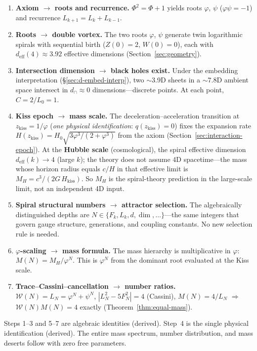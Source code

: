 \documentclass[12pt,a4paper]{article}
\begin{document}
\begin{enumerate}[nosep]
\item \textbf{Axiom $\to$ roots and recurrence.}\; $\Phi^2 = \Phi + 1$ yields roots $\varphi$, $\psi$ ($\varphi\psi = -1$) and recurrence $L_{k+1} = L_k + L_{k-1}$.
\item \textbf{Roots $\to$ double vortex.}\; The two roots $\varphi$, $\psi$ generate twin logarithmic spirals with sequential birth ($Z(0)=2$, $W(0)=0$), each with $d_{\mathrm{eff}}(4) \approx 3.92$ effective dimensions (Section~\ref{sec:geometry}).
\item \textbf{Intersection dimension $\to$ black holes exist.}\; Under the embedding interpretation (\S\ref{sec:d-embed-interp}), two $\sim$3.9D sheets in a $\sim$7.8D ambient space intersect in $d_\cap \approx 0$ dimensions---discrete points.  At each point, $C = 2/L_0 = 1$.
\item \textbf{Kiss epoch $\to$ mass scale.}\; The deceleration--acceleration transition at $z_{\mathrm{kiss}} = 1/\varphi$ (\emph{one physical identification}: $q(z_{\mathrm{kiss}}) = 0$) fixes the expansion rate $H(z_{\mathrm{kiss}}) = H_0\sqrt{3\varphi^3/(2+\varphi^3)}$ from the axiom (Section~\ref{sec:interaction-epoch}). At the \textbf{Hubble scale} (cosmological), the spiral effective dimension $d_{\mathrm{eff}}(k) \to 4$ (large $k$); the theory does not assume 4D spacetime---the mass whose horizon radius equals $c/H$ in that effective limit is $M_H = c^3/(2G\,H_{\mathrm{kiss}})$. So $M_H$ is the spiral-theory prediction in the large-scale limit, not an independent 4D input.
\item \textbf{Spiral structural numbers $\to$ attractor selection.}\; The algebraically distinguished depths are $N \in \{F_k, L_k, d, \dim, \ldots\}$---the same integers that govern gauge structure, generations, and coupling constants.  No new selection rule is needed.
\item \textbf{$\varphi$-scaling $\to$ mass formula.}\; The mass hierarchy is multiplicative in $\varphi$: $M(N) = M_H/\varphi^N$.  This is $\varphi^N$ from the dominant root evaluated at the Kiss scale.
\item \textbf{Trace--Cassini--cancellation $\to$ number ratios.}\; $\mathcal{W}(N) = L_N = \varphi^N + \psi^N$, $|L_N^2 - 5F_N^2| = 4$ (Cassini), $M(N) = 4/L_N$ $\Rightarrow$ $\mathcal{W}(N) M(N) = 4$ exactly (Theorem~\ref{thm:equal-mass}).
\end{enumerate}

\noindent Steps 1--3 and 5--7 are algebraic identities (derived).  Step~4 is the single physical identification (derived).  The entire mass spectrum, number distribution, and mass deserts follow with zero free parameters.
\end{document}

